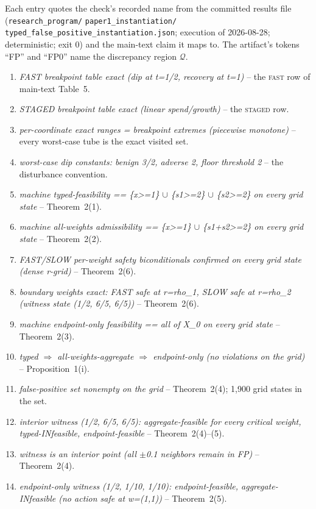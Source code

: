 \documentclass[preprint,11pt,authoryear]{elsarticle}
\theoremstyle{remark}
\newcommand{\Q}{\mathcal{Q}}
\newcommand{\act}[1]{\textsc{#1}}
\begin{document}
Each entry quotes the check's recorded name from the committed results file (\texttt{research\_program/} \texttt{paper1\_instantiation/} \texttt{typed\_false\_positive\_instantiation.json}; execution of 2026-08-28; deterministic; exit 0) and the main-text claim it maps to. The artifact's tokens ``FP'' and ``FP0'' name the discrepancy region $\Q$.
\begin{enumerate}[leftmargin=2em,itemsep=1pt]
\item \emph{FAST breakpoint table exact (dip at t=1/2, recovery at t=1)} -- the \act{fast} row of main-text Table~5.
\item \emph{STAGED breakpoint table exact (linear spend/growth)} -- the \act{staged} row.
\item \emph{per-coordinate exact ranges = breakpoint extremes (piecewise monotone)} -- every worst-case tube is the exact visited set.
\item \emph{worst-case dip constants: benign 3/2, adverse 2, floor threshold 2} -- the disturbance convention.
\item \emph{machine typed-feasibility == \{x>=1\} $\cup$ \{s1>=2\} $\cup$ \{s2>=2\} on every grid state} -- Theorem~2(1).
\item \emph{machine all-weights admissibility == \{x>=1\} $\cup$ \{s1+s2>=2\} on every grid state} -- Theorem~2(2).
\item \emph{FAST/SLOW per-weight safety biconditionals confirmed on every grid state (dense r-grid)} -- Theorem~2(6).
\item \emph{boundary weights exact: FAST safe at r=rho\_1, SLOW safe at r=rho\_2 (witness state (1/2, 6/5, 6/5))} -- Theorem~2(6).
\item \emph{machine endpoint-only feasibility == all of X\_0 on every grid state} -- Theorem~2(3).
\item \emph{typed $\Rightarrow$ all-weights-aggregate $\Rightarrow$ endpoint-only (no violations on the grid)} -- Proposition~1(i).
\item \emph{false-positive set nonempty on the grid} -- Theorem~2(4); 1,900 grid states in the set.
\item \emph{interior witness (1/2, 6/5, 6/5): aggregate-feasible for every critical weight, typed-INfeasible, endpoint-feasible} -- Theorem~2(4)--(5).
\item \emph{witness is an interior point (all $\pm$0.1 neighbors remain in FP)} -- Theorem~2(4).
\item \emph{endpoint-only witness (1/2, 1/10, 1/10): endpoint-feasible, aggregate-INfeasible (no action safe at w=(1,1))} -- Theorem~2(5).

\end{enumerate}
\end{document}
